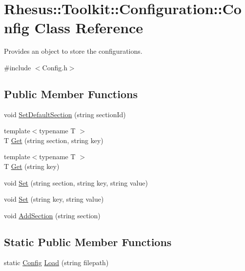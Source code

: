 \hypertarget{class_rhesus_1_1_toolkit_1_1_configuration_1_1_config}{\section{Rhesus\-:\-:Toolkit\-:\-:Configuration\-:\-:Config Class Reference}
\label{class_rhesus_1_1_toolkit_1_1_configuration_1_1_config}
}


Provides an object to store the configurations.  




{\ttfamily \#include $<$Config.\-h$>$}

\subsection*{Public Member Functions}
\begin{DoxyCompactItemize}
\item 
void \hyperlink{class_rhesus_1_1_toolkit_1_1_configuration_1_1_config_ac497aed260f287a48ca7b31855aad6a7}{Set\-Default\-Section} (string section\-Id)
\item 
{\footnotesize template$<$typename T $>$ }\\T \hyperlink{class_rhesus_1_1_toolkit_1_1_configuration_1_1_config_a16ddb859de362572abd023c57cf78088}{Get} (string section, string key)
\item 
{\footnotesize template$<$typename T $>$ }\\T \hyperlink{class_rhesus_1_1_toolkit_1_1_configuration_1_1_config_acbe96dd869dcafae2ef5b37ee97f2054}{Get} (string key)
\item 
void \hyperlink{class_rhesus_1_1_toolkit_1_1_configuration_1_1_config_a424b44274d79f0c7405ee381ae39b386}{Set} (string section, string key, string value)
\item 
void \hyperlink{class_rhesus_1_1_toolkit_1_1_configuration_1_1_config_af41294a577a04515b539899d56194954}{Set} (string key, string value)
\item 
void \hyperlink{class_rhesus_1_1_toolkit_1_1_configuration_1_1_config_a8148037c82fe538c53a4566c40c888b6}{Add\-Section} (string section)
\end{DoxyCompactItemize}
\subsection*{Static Public Member Functions}
\begin{DoxyCompactItemize}
\item 
static \hyperlink{class_rhesus_1_1_toolkit_1_1_configuration_1_1_config}{Config} \hyperlink{class_rhesus_1_1_toolkit_1_1_configuration_1_1_config_a341171754cc7bcdb51630cc09e277888}{Load} (string filepath)
\end{DoxyCompactItemize}


